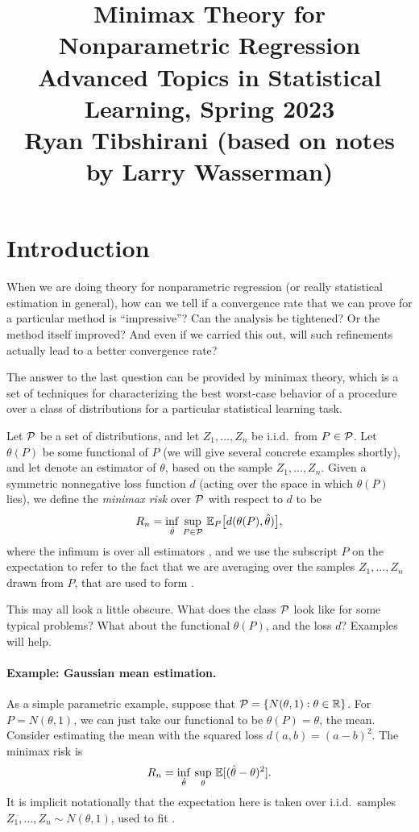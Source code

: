 \documentclass{article}
\title{Minimax Theory for Nonparametric Regression \\ \smallskip
\large Advanced Topics in Statistical Learning, Spring 2023 \\ \smallskip
Ryan Tibshirani (based on notes by Larry Wasserman)}
\author{}
\date{}
\begin{document}
\maketitle
\RaggedRight
\vspace{-50pt}

\section{Introduction}

When we are doing theory for nonparametric regression (or really statistical
estimation in general), how can we tell if a convergence rate that we can prove
for a particular method is ``impressive''? Can the analysis be tightened? Or the
method itself improved? And even if we carried this out, will such refinements 
actually lead to a better convergence rate?   

The answer to the last question can be provided by minimax theory, which is a
set of techniques for characterizing the best worst-case behavior of a procedure
over a class of distributions for a particular statistical learning task. 

Let $\mathcal{P}$ be a set of distributions, and let $Z_1,\dots,Z_n$ be i.i.d.\ from $P
\in \mathcal{P}$. Let $\theta(P)$ be some functional of $P$ (we will give several
concrete examples shortly), and let 
denote an estimator of $\theta$, based on the sample $Z_1,\dots,Z_n$.  Given a
symmetric nonnegative loss function $d$ (acting over the space in which 
$\theta(P)$ lies), we define the \emph{minimax risk} over $\mathcal{P}$ with respect to
$d$ to be   
\[
R_n = \inf_{\hat{\theta}} \, \sup_{P \in \mathcal{P}} \, \mathbb{E}_P \big[ d(\theta(P), \hat{\theta})
\big],  
\]
where the infimum is over all estimators \smash{$\htheta$}, and we use the
subscript $P$ on the expectation to refer to the fact that we are averaging over
the samples $Z_1,\dots,Z_n$ drawn from $P$, that are used to form
\smash{$\htheta$}.       

This may all look a little obscure. What does the class $\mathcal{P}$ look like for some
typical problems? What about the functional $\theta(P)$, and the loss $d$?
Examples will help.    

\paragraph{Example: Gaussian mean estimation.}

As a simple parametric example, suppose that $\mathcal{P} = \{ N(\theta,1) : \theta \in
\mathbb{R}\}$. For $P = N(\theta, 1)$, we can just take our functional to be $\theta(P)=
\theta$, the mean. Consider estimating the mean with the squared loss $d(a, b) 
= (a-b)^2$. The minimax risk is   
\[
R_n = \inf_{\hat{\theta}} \, \sup_\theta \, \mathbb{E}[ (\hat{\theta} - \theta)^2].
\]
It is implicit notationally that the expectation here is taken over i.i.d.\
samples $Z_1,\dots,Z_n \sim N(\theta,1)$, used to fit \smash{$\htheta$}.
\end{document}
